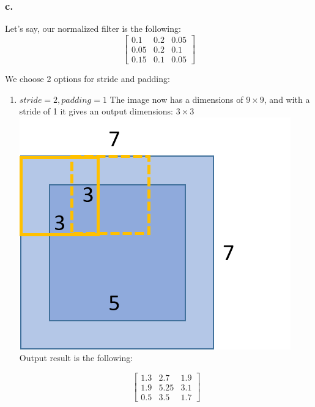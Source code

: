 \documentclass[a4paper]{iacas}
\begin{document}
\subsubsection{c.}
Let's say, our normalized filter is the following:
\begin{equation*}
\left[
\begin{matrix}
0.1 & 0.2 & 0. 05 \\
0.05 & 0.2 & 0.1 \\
0.15 & 0.1 & 0.05
\end{matrix}
\right]
\end{equation*}

We choose 2 options for stride and padding:

\begin{enumerate}
\item $stride = 2, padding = 1$
The image now has a dimensions of $9\times9$, and with a stride of 1 it gives an output dimensions: $3\times3$
\newline
\includegraphics[scale=0.8]{imgs/q_1_31.png}
\newline
Output result is the following:

\begin{equation*}
\left[
\begin{matrix}
1.3 & 2.7 & 1.9 \\
1.9 & 5.25 & 3.1 \\
0.5 & 3.5 & 1.7
\end{matrix}
\right]
\end{equation*}



\end{enumerate}
\end{document}
